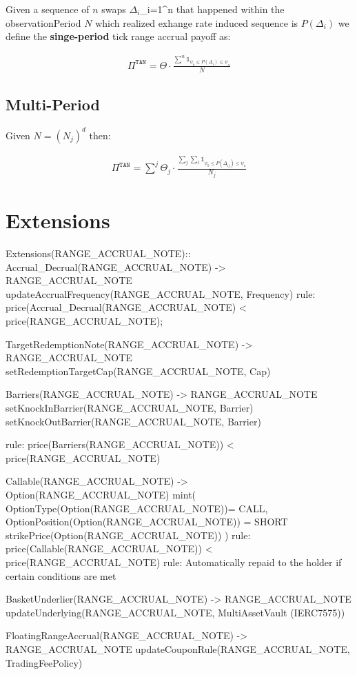 \documentclass[11pt]{article}
\begin{document}
 Given a sequence of \(n\) swaps \(\Delta_i\)_{i=1}^n that happened within the observationPeriod \(N\)
 which realized exhange rate induced sequence is \(P (\Delta_i)\) we define the \textbf{singe-period} tick range accrual payoff as:

 \begin{align*}
   \Pi^{\texttt{TAN}} = \Theta \cdot \frac{\sum^n \mathbb{1}_{ \psi_b \leq P(\Delta_i) \leq \psi_a}}{N}
 \end{align*}


 
 \subsection{Multi-Period}

 Given \(N =(N_j)^d\) then:

 \begin{align*}
     \Pi^{\texttt{TAN}} = \sum^j \Theta_j \cdot \frac{\sum_j \sum_i \mathbb{1}_{ \psi_b \leq P(\Delta_{ij}) \leq \psi_a}}{N_j} 
  \end{align*}


 
 \section{Extensions}

Extensions(RANGE_ACCRUAL_NOTE)::
	Accrual_Decrual(RANGE_ACCRUAL_NOTE) -> RANGE_ACCRUAL_NOTE
		updateAccrualFrequency(RANGE_ACCRUAL_NOTE, Frequency)
	rule: price(Accrual_Decrual(RANGE_ACCRUAL_NOTE) < price(RANGE_ACCRUAL_NOTE);
	
	TargetRedemptionNote(RANGE_ACCRUAL_NOTE) -> RANGE_ACCRUAL_NOTE
		setRedemptionTargetCap(RANGE_ACCRUAL_NOTE, Cap)

	Barriers(RANGE_ACCRUAL_NOTE) -> RANGE_ACCRUAL_NOTE
		setKnockInBarrier(RANGE_ACCRUAL_NOTE, Barrier)
		setKnockOutBarrier(RANGE_ACCRUAL_NOTE, Barrier)

	rule: price(Barriers(RANGE_ACCRUAL_NOTE)) < price(RANGE_ACCRUAL_NOTE)

	Callable(RANGE_ACCRUAL_NOTE) -> Option(RANGE_ACCRUAL_NOTE)
		mint(
			OptionType(Option(RANGE_ACCRUAL_NOTE))= CALL,
			OptionPosition(Option(RANGE_ACCRUAL_NOTE)) = SHORT
			strikePrice(Option(RANGE_ACCRUAL_NOTE))
		)
	 rule: price(Callable(RANGE_ACCRUAL_NOTE)) < price(RANGE_ACCRUAL_NOTE)
	 rule: Automatically repaid to the holder if certain conditions are met

	 BasketUnderlier(RANGE_ACCRUAL_NOTE) -> RANGE_ACCRUAL_NOTE
	 	updateUnderlying(RANGE_ACCRUAL_NOTE, MultiAssetVault (IERC7575))

	FloatingRangeAccrual(RANGE_ACCRUAL_NOTE) -> RANGE_ACCRUAL_NOTE
		updateCouponRule(RANGE_ACCRUAL_NOTE, TradingFeePolicy)
\end{document}
